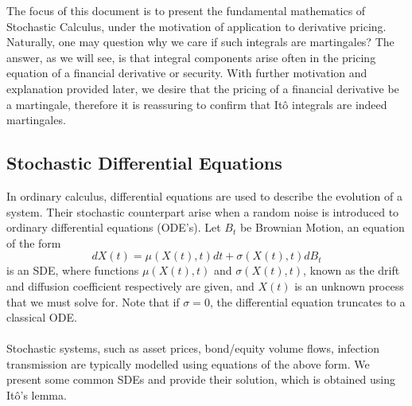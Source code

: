 \documentclass{article}
\begin{document}
The focus of this document is to present the fundamental mathematics of Stochastic Calculus, under the motivation of application to derivative pricing. Naturally, one may question why we care if such integrals are martingales? The answer, as we will see, is that integral components arise often in the pricing equation of a financial derivative or security. With further motivation and explanation provided later, we desire that the pricing of a financial derivative be a martingale, therefore it is reassuring to confirm that Itô integrals are indeed martingales. 

\newpage
\subsection{Stochastic Differential Equations}
In ordinary calculus, differential equations are used to describe the evolution of a system. Their stochastic counterpart arise when a random noise is introduced to ordinary differential equations (ODE's). Let $B_t$ be Brownian Motion, an equation of the form 
$$dX(t) = \mu(X(t), t)dt + \sigma(X(t), t)dB_t$$
is an SDE, where functions $\mu(X(t), t)$ and $\sigma(X(t), t)$, known as the drift and diffusion coefficient respectively are given, and $X(t)$ is an unknown process that we must solve for. Note that if $\sigma=0$, the differential equation truncates to a classical ODE. \\
\\
Stochastic systems, such as asset prices, bond/equity volume flows, infection transmission are typically modelled using equations of the above form. We present some common SDEs and provide their solution, which is obtained using Itô's lemma. 
\end{document}

